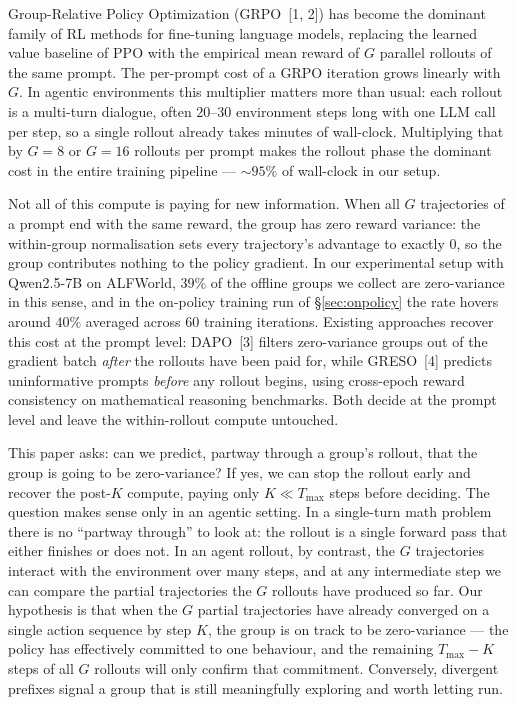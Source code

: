 \documentclass{article}
\begin{document}
Group-Relative Policy Optimization (GRPO~[1, 2]) has become the
dominant family of RL methods for fine-tuning language models,
replacing the learned value baseline of PPO with the empirical
mean reward of $G$ parallel rollouts of the same prompt. The
per-prompt cost of a GRPO iteration grows linearly with $G$. In
agentic environments this multiplier matters more than usual:
each rollout is a multi-turn dialogue, often $20$--$30$
environment steps long with one LLM call per step, so a single
rollout already takes minutes of wall-clock. Multiplying that by
$G\!=\!8$ or $G\!=\!16$ rollouts per prompt makes the rollout
phase the dominant cost in the entire training pipeline ---
$\sim\!95\%$ of wall-clock in our setup.

Not all of this compute is paying for new information. When all
$G$ trajectories of a prompt end with the same reward, the group
has zero reward variance: the within-group normalisation sets
every trajectory's advantage to exactly $0$, so the group
contributes nothing to the policy gradient. In our experimental
setup with Qwen2.5-7B on ALFWorld, $39\%$ of the offline groups
we collect are zero-variance in this sense, and in the on-policy
training run of \S\ref{sec:onpolicy} the rate hovers around
$40\%$ averaged across $60$ training iterations. Existing
approaches recover this cost at the prompt level: DAPO~[3] filters
zero-variance groups out of the gradient batch \emph{after} the
rollouts have been paid for, while GRESO~[4] predicts
uninformative prompts \emph{before} any rollout begins, using
cross-epoch reward consistency on mathematical reasoning
benchmarks. Both decide at the prompt level and leave the
within-rollout compute untouched.

This paper asks: can we predict, partway through a group's
rollout, that the group is going to be zero-variance? If yes,
we can stop the rollout early and recover the post-$K$ compute,
paying only $K\!\ll\!T_{\max}$ steps before deciding. The
question makes sense only in an agentic setting. In a single-turn
math problem there is no ``partway through'' to look at: the
rollout is a single forward pass that either finishes or does
not. In an agent rollout, by contrast, the $G$ trajectories
interact with the environment over many steps, and at any
intermediate step we can compare the partial trajectories the
$G$ rollouts have produced so far. Our hypothesis is that when
the $G$ partial trajectories have already converged on a single
action sequence by step $K$, the group is on track to be
zero-variance --- the policy has effectively committed to one
behaviour, and the remaining $T_{\max}\!-\!K$ steps of all $G$
rollouts will only confirm that commitment. Conversely, divergent
prefixes signal a group that is still meaningfully exploring and
worth letting run.
\end{document}
